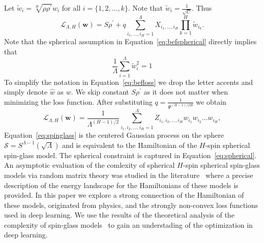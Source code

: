 \documentclass[twoside]{article}
\begin{document}
Let $\tilde{w}_i = \sqrt[H]{\rho\rho^{'}}w_i$ for all $i = \{1,2,\dots,k\}$. Note that $\tilde{w}_i = \frac{1}{\sqrt{C}}$. Thus
\begin{equation}
\mathcal{L}_{\Lambda,H}({\bm w}) = S\rho^{'} + q\sum_{i_1,\dots,i_H=1}^{\Lambda}X_{i_1,\dots,i_H}\prod_{k = 1}^{H}\tilde{w}_{i_k}.
\label{eq:befloss}
\end{equation}
Note that the spherical assumption in Equation~\ref{eq:befspherical} directly implies that
\begin{equation}
\frac{1}{\Lambda}\sum_{i=1}^{\Lambda}\tilde{w}_i^2 = 1
\label{eq:spherical}
\end{equation}
To simplify the notation in Equation~\ref{eq:befloss} we drop the letter accents and simply denote $\hat{w}$ as $w$. We skip constant $S\rho^{'}$ as it does not matter when minimizing the loss function. After substituting $q = \frac{1}{\Psi^{(H-1)/2H}}$ we obtain
\begin{equation}
\mathcal{L}_{\!\Lambda,H}({\bm w}) \!=\! \frac{1}{\Lambda^{\!(H\!-\!1)/2}}\!\!\!\!\!\!\!\sum_{i_1,i_2,\dots,i_H=1}^{\Lambda}\!\!\!\!\!\!\!\!\!\!\!Z_{i_1,i_2,\dots,i_H}\!w_{i_1}\!w_{i_2}\!\dots\!w_{i_H},
\label{eq:spinglass}
\end{equation}
Equation~\ref{eq:spinglass} is the centered Gaussian process on the sphere $\mathcal{S} = S^{\Lambda-1}(\sqrt{\Lambda})$ and is equivalent to the Hamiltonian of the $H$-spin spherical spin-glass model. The spherical constraint is captured in Equation~\ref{eq:spherical}. An asymptotic evaluation of the comlexity of spherical $H$-spin spherical spin-glass models via random matrix theory was studied in the literature~\cite{AAC2010} where a precise description of the energy landscape for the Hamiltonians of these models is provided. In this paper we explore a strong connection of the Hamiltonian of these models, originated from physics, and the strongly non-convex loss functions used in deep learning. We use the results of the theoretical analysis of the complexity of spin-glass models~\cite{AAC2010} to gain an understading of the optimization in deep learning. 
\end{document}
